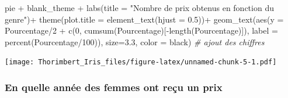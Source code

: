 \documentclass[
]{article}
\newenvironment{Shaded}{\begin{snugshade}}{\end{snugshade}}
\newcommand{\AttributeTok}[1]{\textcolor[rgb]{0.77,0.63,0.00}{#1}}
\newcommand{\CommentTok}[1]{\textcolor[rgb]{0.56,0.35,0.01}{\textit{#1}}}
\newcommand{\DecValTok}[1]{\textcolor[rgb]{0.00,0.00,0.81}{#1}}
\newcommand{\FloatTok}[1]{\textcolor[rgb]{0.00,0.00,0.81}{#1}}
\newcommand{\FunctionTok}[1]{\textcolor[rgb]{0.00,0.00,0.00}{#1}}
\newcommand{\NormalTok}[1]{#1}
\newcommand{\SpecialCharTok}[1]{\textcolor[rgb]{0.00,0.00,0.00}{#1}}
\newcommand{\StringTok}[1]{\textcolor[rgb]{0.31,0.60,0.02}{#1}}
\begin{document}
\begin{Shaded}
\begin{Highlighting}[]
\NormalTok{pie }\SpecialCharTok{+}
\NormalTok{  blank\_theme }\SpecialCharTok{+} \FunctionTok{labs}\NormalTok{(}\AttributeTok{title =} \StringTok{"Nombre de prix obtenus en fonction du genre"}\NormalTok{)}\SpecialCharTok{+}
  \FunctionTok{theme}\NormalTok{(}\AttributeTok{plot.title =} \FunctionTok{element\_text}\NormalTok{(}\AttributeTok{hjust =} \FloatTok{0.5}\NormalTok{))}\SpecialCharTok{+}
  \FunctionTok{geom\_text}\NormalTok{(}\FunctionTok{aes}\NormalTok{(}\AttributeTok{y =}\NormalTok{ Pourcentage}\SpecialCharTok{/}\DecValTok{2} \SpecialCharTok{+} \FunctionTok{c}\NormalTok{(}\DecValTok{0}\NormalTok{, }\FunctionTok{cumsum}\NormalTok{(Pourcentage)[}\SpecialCharTok{{-}}\FunctionTok{length}\NormalTok{(Pourcentage)]),}
                \AttributeTok{label =} \FunctionTok{percent}\NormalTok{(Pourcentage}\SpecialCharTok{/}\DecValTok{100}\NormalTok{)), }\AttributeTok{size=}\FloatTok{3.3}\NormalTok{, }\AttributeTok{color =} \StringTok{\textquotesingle{}black\textquotesingle{}}\NormalTok{) }\CommentTok{\# ajout des chiffres}
\end{Highlighting}
\end{Shaded}

\texttt{[image: Thorimbert\_Iris\_files/figure-latex/unnamed-chunk-5-1.pdf]}

\hypertarget{en-quelle-annuxe9e-des-femmes-ont-reuxe7u-un-prix}{%
\subsubsection{\texorpdfstring{\textbf{En quelle année des femmes ont
reçu un
prix}}{En quelle année des femmes ont reçu un prix}}\label{en-quelle-annuxe9e-des-femmes-ont-reuxe7u-un-prix}}
\end{document}
